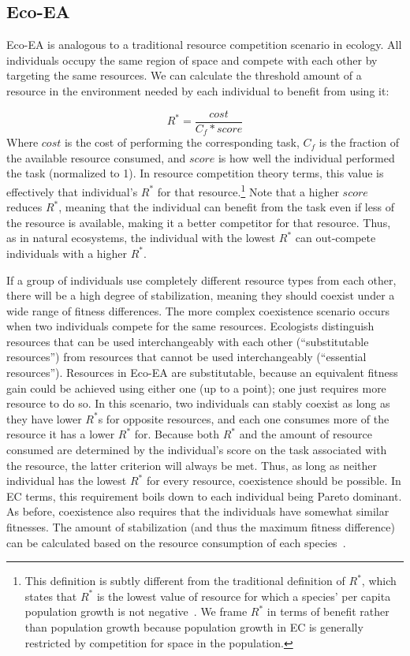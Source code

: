 \subsection{Eco-EA}

Eco-EA is analogous to a traditional resource competition scenario in ecology. All individuals occupy the same region of space and compete with each other by targeting
the same resources. We can calculate the threshold amount of a resource in the environment needed by each individual to benefit from using it:

\begin{equation}
R^* = \frac{cost}{C_f * score}
\label{eq:ecoea-rstar}
\end{equation}
Where $cost$ is the cost of performing the corresponding task, $C_f$ is the fraction of the available resource consumed, and $score$ is how well the individual performed the task (normalized to 1). In resource competition theory terms, this value is effectively that individual's $R^*$ for that resource.\footnote{This definition is subtly different from the traditional definition of $R^*$, which states that $R^*$ is the lowest value of resource for which a species' per capita population growth is not negative~\cite{chase_ecological_2003}. We frame $R^*$ in terms of benefit rather than population growth because population growth in EC is generally restricted by competition for space in the population.} Note that a higher $score$ reduces $R^*$, meaning that the individual can benefit from the task even if less of the resource is available, making it a better competitor for that resource. Thus, as in natural ecosystems, the individual with the lowest $R^*$ can out-compete individuals with a higher $R^*$.

If a group of individuals use completely different resource types from each other, there will be a high degree of stabilization, meaning they should coexist under a wide range of fitness differences. The more complex coexistence scenario occurs when two individuals compete for the same resources. Ecologists distinguish resources that can be used interchangeably with each other (``substitutable resources'') from resources that cannot be used interchangeably (``essential resources''). Resources in Eco-EA are substitutable, because an equivalent fitness gain could be achieved using either one (up to a point); one just requires more resource to do so.  In this scenario, two individuals can stably coexist as long as they have lower $R^*$s for opposite resources, and each one consumes more of the resource it has a lower $R^*$ for. Because both $R^*$ and the amount of resource consumed are determined by the individual's score on the task associated with the resource, the latter criterion will always be met. Thus, as long as neither individual has the lowest $R^*$ for every resource, coexistence should be possible. In EC terms, this requirement boils down to each individual being Pareto dominant. As before, coexistence also requires that the individuals have somewhat similar fitnesses. The amount of stabilization (and thus the maximum fitness difference) can be calculated based on the resource consumption of each species~\cite{letten_linking_2017}.

